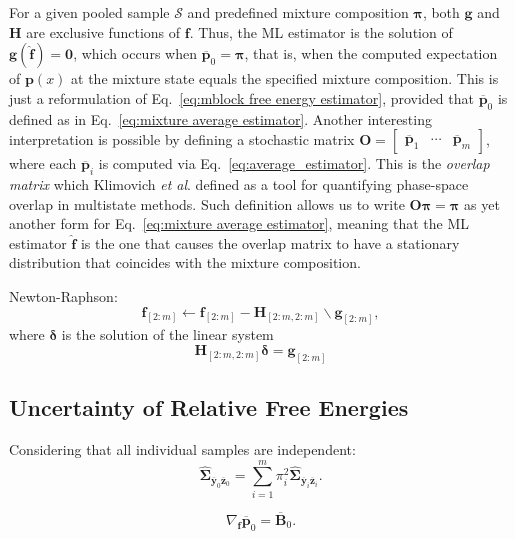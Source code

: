 \documentclass[aip,jcp,reprint,amsmath,amssymb]{revtex4-1}
\newcommand{\mt}[1]{\boldsymbol{\mathbf{#1}}}           %
\newcommand{\vt}[1]{\boldsymbol{\mathbf{#1}}}           %
\begin{document}
For a given pooled sample $\mathcal S$ and predefined mixture composition $\vt \pi$, both $\vt g$ and $\mt H$ are exclusive functions of $\vt f$. Thus, the ML estimator is the solution of $\vt g(\hat{\vt f}) = \vt 0$, which occurs when $\overline{\vt p}_0 = \vt \pi$, that is, when the computed expectation of $\vt p(x)$ at the mixture state equals the specified mixture composition. This is just a reformulation of Eq.~\eqref{eq:mblock free energy estimator}, provided that $\overline{\vt p}_0$ is defined as in Eq.~\eqref{eq:mixture average estimator}. Another interesting interpretation is possible by defining a stochastic matrix $\mt O = [\begin{array}{ccc} \overline{\vt p}_1 & \cdots & \overline{\vt p}_m \end{array}]$, where each $\overline{\vt p}_i$ is computed via Eq.~\eqref{eq:average_estimator}. This is the \textit{overlap matrix} which Klimovich \textit{et al}.\cite{Klimovich_2015} defined as a tool for quantifying phase-space overlap in multistate methods. Such definition allows us to write $\mt O \vt \pi = \vt \pi$ as yet another form for Eq.~\eqref{eq:mixture average estimator}, meaning that the ML estimator $\hat{\vt f}$ is the one that causes the overlap matrix to have a stationary distribution that coincides with the mixture composition.


Newton-Raphson:
\begin{equation}
\label{eq:mblock Newton-Raphson}
{\vt f}_{[2:m]} \leftarrow {\vt f}_{[2:m]} - {\mt H}_{[2:m,2:m]} \backslash {\vt g}_{[2:m]},
\end{equation}
where $\vt \delta$ is the solution of the linear system
\begin{equation}
{\mt H}_{[2:m,2:m]} {\vt \delta} = {\vt g}_{[2:m]}
\end{equation}

\subsection{Uncertainty of Relative Free Energies}

Considering that all individual samples are independent:
\begin{equation}
\hat{\mt \Sigma}_{\overline{\vt y}_0 \overline{\vt z}_0} = \sum_{i=1}^m \pi_i^2 \hat{\mt \Sigma}_{\overline{\vt y}_i \overline{\vt z}_i}.
\end{equation}

\begin{equation}
\nabla_{\vt f}\overline{\vt p}_0 = \overline{\mt B}_0.
\end{equation}
\end{document}
